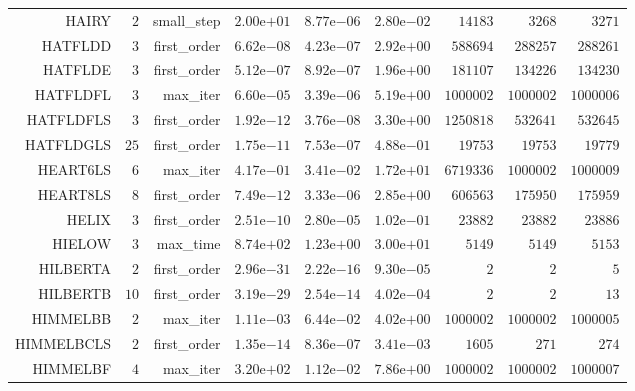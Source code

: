 \begin{longtable}{rrrrrrrrr}
HAIRY & \(     2\) & small\_step & \( 2.00\)e\(+01\) & \( 8.77\)e\(-06\) & \( 2.80\)e\(-02\) & \( 14183\) & \(  3268\) & \(  3271\) \\
HATFLDD & \(     3\) & first\_order & \( 6.62\)e\(-08\) & \( 4.23\)e\(-07\) & \( 2.92\)e\(+00\) & \(588694\) & \(288257\) & \(288261\) \\
HATFLDE & \(     3\) & first\_order & \( 5.12\)e\(-07\) & \( 8.92\)e\(-07\) & \( 1.96\)e\(+00\) & \(181107\) & \(134226\) & \(134230\) \\
HATFLDFL & \(     3\) & max\_iter & \( 6.60\)e\(-05\) & \( 3.39\)e\(-06\) & \( 5.19\)e\(+00\) & \(1000002\) & \(1000002\) & \(1000006\) \\
HATFLDFLS & \(     3\) & first\_order & \( 1.92\)e\(-12\) & \( 3.76\)e\(-08\) & \( 3.30\)e\(+00\) & \(1250818\) & \(532641\) & \(532645\) \\
HATFLDGLS & \(    25\) & first\_order & \( 1.75\)e\(-11\) & \( 7.53\)e\(-07\) & \( 4.88\)e\(-01\) & \( 19753\) & \( 19753\) & \( 19779\) \\
HEART6LS & \(     6\) & max\_iter & \( 4.17\)e\(-01\) & \( 3.41\)e\(-02\) & \( 1.72\)e\(+01\) & \(6719336\) & \(1000002\) & \(1000009\) \\
HEART8LS & \(     8\) & first\_order & \( 7.49\)e\(-12\) & \( 3.33\)e\(-06\) & \( 2.85\)e\(+00\) & \(606563\) & \(175950\) & \(175959\) \\
HELIX & \(     3\) & first\_order & \( 2.51\)e\(-10\) & \( 2.80\)e\(-05\) & \( 1.02\)e\(-01\) & \( 23882\) & \( 23882\) & \( 23886\) \\
HIELOW & \(     3\) & max\_time & \( 8.74\)e\(+02\) & \( 1.23\)e\(+00\) & \( 3.00\)e\(+01\) & \(  5149\) & \(  5149\) & \(  5153\) \\
HILBERTA & \(     2\) & first\_order & \( 2.96\)e\(-31\) & \( 2.22\)e\(-16\) & \( 9.30\)e\(-05\) & \(     2\) & \(     2\) & \(     5\) \\
HILBERTB & \(    10\) & first\_order & \( 3.19\)e\(-29\) & \( 2.54\)e\(-14\) & \( 4.02\)e\(-04\) & \(     2\) & \(     2\) & \(    13\) \\
HIMMELBB & \(     2\) & max\_iter & \( 1.11\)e\(-03\) & \( 6.44\)e\(-02\) & \( 4.02\)e\(+00\) & \(1000002\) & \(1000002\) & \(1000005\) \\
HIMMELBCLS & \(     2\) & first\_order & \( 1.35\)e\(-14\) & \( 8.36\)e\(-07\) & \( 3.41\)e\(-03\) & \(  1605\) & \(   271\) & \(   274\) \\
HIMMELBF & \(     4\) & max\_iter & \( 3.20\)e\(+02\) & \( 1.12\)e\(-02\) & \( 7.86\)e\(+00\) & \(1000002\) & \(1000002\) & \(1000007\) \\

\end{longtable}
